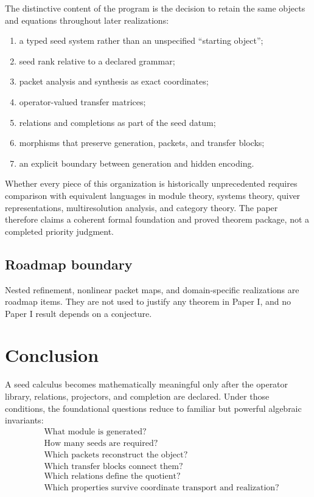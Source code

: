\documentclass[11pt]{article}
\theoremstyle{definition}
\theoremstyle{remark}
\begin{document}
The distinctive content of the program is the decision to retain the same objects and equations throughout later realizations:
\begin{enumerate}[label=(\roman*)]
\item a typed seed system rather than an unspecified ``starting object'';
\item seed rank relative to a declared grammar;
\item packet analysis and synthesis as exact coordinates;
\item operator-valued transfer matrices;
\item relations and completions as part of the seed datum;
\item morphisms that preserve generation, packets, and transfer blocks;
\item an explicit boundary between generation and hidden encoding.
\end{enumerate}

Whether every piece of this organization is historically unprecedented requires comparison with equivalent languages in module theory, systems theory, quiver representations, multiresolution analysis, and category theory. The paper therefore claims a coherent formal foundation and proved theorem package, not a completed priority judgment.

\subsection{Roadmap boundary}

Nested refinement, nonlinear packet maps, and domain-specific realizations are roadmap items. They are not used to justify any theorem in Paper I, and no Paper I result depends on a conjecture.

\section{Conclusion}

A seed calculus becomes mathematically meaningful only after the operator library, relations, projectors, and completion are declared. Under those conditions, the foundational questions reduce to familiar but powerful algebraic invariants:
\[
\boxed{
\begin{aligned}
&\text{What module is generated?}\\
&\text{How many seeds are required?}\\
&\text{Which packets reconstruct the object?}\\
&\text{Which transfer blocks connect them?}\\
&\text{Which relations define the quotient?}\\
&\text{Which properties survive coordinate transport and realization?}
\end{aligned}
}
\]
\end{document}
